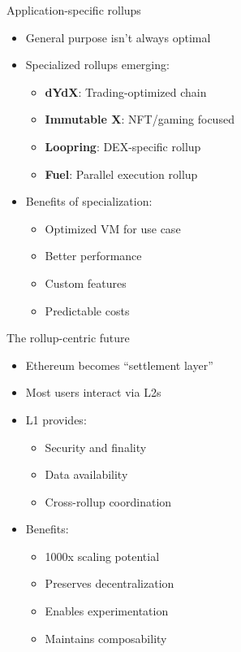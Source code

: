 \documentclass[aspectratio=169, lualatex, handout]{beamer}
\begin{document}
\begin{frame}{Application-specific rollups}
	\begin{itemize}
		\item General purpose isn't always optimal
		\item Specialized rollups emerging:
		      \begin{itemize}
			      \item \textbf{dYdX}: Trading-optimized chain
			      \item \textbf{Immutable X}: NFT/gaming focused
			      \item \textbf{Loopring}: DEX-specific rollup
			      \item \textbf{Fuel}: Parallel execution rollup
		      \end{itemize}
		\item Benefits of specialization:
		      \begin{itemize}
			      \item Optimized VM for use case
			      \item Better performance
			      \item Custom features
			      \item Predictable costs
		      \end{itemize}
	\end{itemize}
\end{frame}

\begin{frame}{The rollup-centric future}
	\begin{itemize}
		\item Ethereum becomes ``settlement layer''
		\item Most users interact via L2s
		\item L1 provides:
		      \begin{itemize}
			      \item Security and finality
			      \item Data availability
			      \item Cross-rollup coordination
		      \end{itemize}
		\item Benefits:
		      \begin{itemize}
			      \item 1000x scaling potential
			      \item Preserves decentralization
			      \item Enables experimentation
			      \item Maintains composability
		      \end{itemize}
	\end{itemize}
\end{frame}
\end{document}
